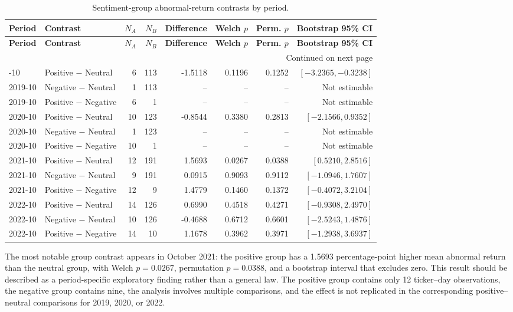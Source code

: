 \documentclass[12pt,a4paper]{article}
\begin{document}
\begin{longtable}{llrrrrrr}
\caption{Sentiment-group abnormal-return contrasts by period.}\label{tab:sentiment-contrasts-multi-year}\\
\toprule
\textbf{Period} & \textbf{Contrast} & \textbf{$N_A$} & \textbf{$N_B$} & \textbf{Difference} & \textbf{Welch $p$} & \textbf{Perm. $p$} & \textbf{Bootstrap 95\% CI} \\
\midrule
\endfirsthead
\toprule
\textbf{Period} & \textbf{Contrast} & \textbf{$N_A$} & \textbf{$N_B$} & \textbf{Difference} & \textbf{Welch $p$} & \textbf{Perm. $p$} & \textbf{Bootstrap 95\% CI} \\
\midrule
\endhead
\midrule
\multicolumn{8}{r}{Continued on next page}\\
\endfoot
\bottomrule
\endlastfoot
2019-10 & Positive $-$ Neutral & 6 & 113 & -1.5118 & 0.1196 & 0.1252 & $[-3.2365,-0.3238]$ \\
2019-10 & Negative $-$ Neutral & 1 & 113 & -- & -- & -- & Not estimable \\
2019-10 & Positive $-$ Negative & 6 & 1 & -- & -- & -- & Not estimable \\
2020-10 & Positive $-$ Neutral & 10 & 123 & -0.8544 & 0.3380 & 0.2813 & $[-2.1566,0.9352]$ \\
2020-10 & Negative $-$ Neutral & 1 & 123 & -- & -- & -- & Not estimable \\
2020-10 & Positive $-$ Negative & 10 & 1 & -- & -- & -- & Not estimable \\
2021-10 & Positive $-$ Neutral & 12 & 191 & 1.5693 & 0.0267 & 0.0388 & $[0.5210,2.8516]$ \\
2021-10 & Negative $-$ Neutral & 9 & 191 & 0.0915 & 0.9093 & 0.9112 & $[-1.0946,1.7607]$ \\
2021-10 & Positive $-$ Negative & 12 & 9 & 1.4779 & 0.1460 & 0.1372 & $[-0.4072,3.2104]$ \\
2022-10 & Positive $-$ Neutral & 14 & 126 & 0.6990 & 0.4518 & 0.4271 & $[-0.9308,2.4970]$ \\
2022-10 & Negative $-$ Neutral & 10 & 126 & -0.4688 & 0.6712 & 0.6601 & $[-2.5243,1.4876]$ \\
2022-10 & Positive $-$ Negative & 14 & 10 & 1.1678 & 0.3962 & 0.3971 & $[-1.2938,3.6937]$ \\
\end{longtable}

The most notable group contrast appears in October 2021: the positive group has a 1.5693 percentage-point higher mean abnormal return than the neutral group, with Welch $p=0.0267$, permutation $p=0.0388$, and a bootstrap interval that excludes zero. This result should be described as a period-specific exploratory finding rather than a general law. The positive group contains only 12 ticker--day observations, the negative group contains nine, the analysis involves multiple comparisons, and the effect is not replicated in the corresponding positive--neutral comparisons for 2019, 2020, or 2022.
\end{document}
